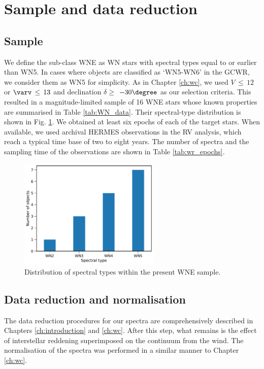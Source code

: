 \section{Sample and data reduction} \label{sect:sample_WNE}
\subsection{Sample}

We define the sub-class WNE as WN stars with spectral types equal to or earlier than WN5. In cases where objects are classified as `WN5-WN6' in the GCWR, we consider them as WN5 for simplicity. As in Chapter \ref{ch:wc}, we used $V\,\leq\,12$ or $\varv\,\leq\,13$ and declination $\delta \ge$ $-30\degree$ as our selection criteria. This resulted in a magnitude-limited sample of 16 WNE stars whose known properties are summarised in Table \ref{tab:WN_data}. Their spectral-type distribution is shown in Fig. \ref{fig:target_dist_WNE}. We obtained at least six epochs of each of the target stars. When available, we used archival HERMES observations in the RV analysis, which reach a typical time base of two to eight years. The number of spectra and the sampling time of the observations are shown in Table \ref{tab:wr_epochs}.  

\begin{figure}[!h]
    \centering
    \includegraphics[width=0.6\textwidth]{chapters/WNE/image/target_dist.pdf}
    \caption{Distribution of spectral types within the present WNE sample.}
    \label{fig:target_dist_WNE}
\end{figure}


\subsection{Data reduction and normalisation}
The data reduction procedures for our spectra are comprehensively described in Chapters \ref{ch:introduction} and \ref{ch:wc}. After this step, what remains is the effect of interstellar reddening superimposed on the continuum from the wind. The normalisation of the spectra was performed in a similar manner to Chapter \ref{ch:wc}. 

